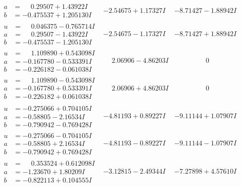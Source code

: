 \documentclass[1p]{elsarticle_modified}
\theoremstyle{definition}
\begin{document}
$$\begin{array}{c|c|c}
\begin{aligned}
a &= \phantom{-}0.29507 + 1.43922 I \\
b &= -0.475537 + 1.205130 I\end{aligned}
 & -2.54675 + 1.17327 I & -8.71427 - 1.88942 I \\ \hline\begin{aligned}
u &= \phantom{-}0.046375 - 0.765714 I \\
a &= \phantom{-}0.29507 - 1.43922 I \\
b &= -0.475537 - 1.205130 I\end{aligned}
 & -2.54675 - 1.17327 I & -8.71427 + 1.88942 I \\ \hline\begin{aligned}
u &= \phantom{-}1.109890 + 0.543098 I \\
a &= -0.167780 - 0.533391 I \\
b &= -0.226182 - 0.061038 I\end{aligned}
 & \phantom{-}2.06906 - 4.86203 I & \phantom{-0.000000 } 0 \\ \hline\begin{aligned}
u &= \phantom{-}1.109890 - 0.543098 I \\
a &= -0.167780 + 0.533391 I \\
b &= -0.226182 + 0.061038 I\end{aligned}
 & \phantom{-}2.06906 + 4.86203 I & \phantom{-0.000000 } 0 \\ \hline\begin{aligned}
u &= -0.275066 + 0.704105 I \\
a &= -0.58805 - 2.16534 I \\
b &= -0.790942 - 0.769428 I\end{aligned}
 & -4.81193 + 0.89227 I & -9.11144 + 1.07907 I \\ \hline\begin{aligned}
u &= -0.275066 - 0.704105 I \\
a &= -0.58805 + 2.16534 I \\
b &= -0.790942 + 0.769428 I\end{aligned}
 & -4.81193 - 0.89227 I & -9.11144 - 1.07907 I \\ \hline\begin{aligned}
u &= \phantom{-}0.353524 + 0.612098 I \\
a &= -1.23670 + 1.80209 I \\
b &= -0.822113 + 0.104555 I\end{aligned}
 & -3.12815 - 2.49344 I & -7.27898 + 4.57610 I \\ \hline\begin{aligned}

\end{aligned}
\end{array}$$
\end{document}
